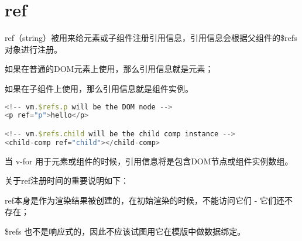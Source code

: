 \begin{lstlisting}[language=JavaScript]

\end{lstlisting}




\begin{lstlisting}[language=JavaScript]

\end{lstlisting}




\begin{lstlisting}[language=JavaScript]

\end{lstlisting}



\chapter{ref}

ref（string）被用来给元素或子组件注册引用信息，引用信息会根据父组件的\$refs对象进行注册。

\begin{compactitem}
\item 如果在普通的DOM元素上使用，那么引用信息就是元素；
\item 如果在子组件上使用，那么引用信息就是组件实例。
\end{compactitem}


\begin{lstlisting}[language=JavaScript]
<!-- vm.$refs.p will be the DOM node -->
<p ref="p">hello</p>

<!-- vm.$refs.child will be the child comp instance -->
<child-comp ref="child"></child-comp>
\end{lstlisting}


当 v-for 用于元素或组件的时候，引用信息将是包含DOM节点或组件实例数组。

关于ref注册时间的重要说明如下：

\begin{compactitem}
\item ref本身是作为渲染结果被创建的，在初始渲染的时候，不能访问它们 - 它们还不存在；
\item \$refs 也不是响应式的，因此不应该试图用它在模版中做数据绑定。
\end{compactitem}



\begin{lstlisting}[language=JavaScript]

\end{lstlisting}




